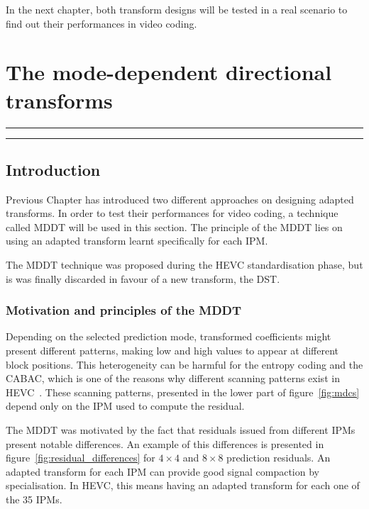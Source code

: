 \documentclass[11pt,a4paper,openright,twoside]{book}
\providecommand{\chaptertoc}{
	\startcontents[chapters]
	\hrule
	\vspace{1em}
	\printcontents[chapters]{}{1}{{\bf\large Contents}}
	\hrule
}
\numberwithin{equation}{section} %
\numberwithin{figure}{section} %
\numberwithin{table}{section} %
\begin{document}
In the next chapter, both transform designs will be tested in a real
scenario to find out their performances in video coding.


\chapter{The mode-dependent directional transforms}
\label{cha:the_mode_dependent_directional_transforms}
\chaptertoc

\section{Introduction}
\label{sec:introduction_to_mddt}

Previous Chapter has introduced two different approaches on designing adapted
transforms.
In order to test their performances for video coding, a technique called
\ac{MDDT} will be used in this section.
The principle of the \ac{MDDT} lies on using an adapted transform learnt
specifically for each \acf{IPM}.

The \ac{MDDT} technique was proposed during the \ac{HEVC} standardisation
phase, but is was finally discarded in favour of a new transform, the
\ac{DST}.

\subsection{Motivation and principles of the \acs{MDDT}}
\label{sub:motivation_of_the_mddt}

Depending on the selected prediction mode, transformed coefficients might
present different patterns, making low and high values to appear at different
block positions.
This heterogeneity can be harmful for the entropy coding and the
\ac{CABAC}, which is one of the reasons why different scanning patterns exist
in \ac{HEVC}~\cite{sole-12-transform-coefficient-coding}.
These scanning patterns, presented in the lower part of
figure~\ref{fig:mdcs} depend only on the \ac{IPM} used to compute the
residual.

The \ac{MDDT} was motivated by the fact that residuals issued from different
\acp{IPM} present notable differences.
An example of this differences is presented in
figure~\ref{fig:residual_differences} for $4\times4$ and $8\times8$ prediction
residuals.
An adapted transform for each \ac{IPM} can provide good signal compaction by
specialisation.
In \ac{HEVC}, this means having an adapted transform for each one of the 35
\acp{IPM}.
\end{document}
